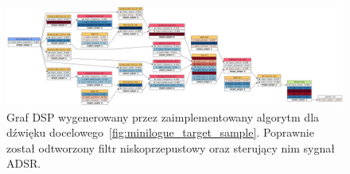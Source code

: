 \begin{figure}[H]
    \centering
    \includegraphics[width=1.0\linewidth]{rys06/evolved_graph_minilogue.png}
    \caption{
      Graf DSP wygenerowany przez zaimplementowany algorytm
      dla dźwięku docelowego~\ref{fig:minilogue_target_sample}.
      Poprawnie został odtworzony filtr niskoprzepustowy oraz
      sterujący nim sygnał ADSR\@.
    }\label{fig:evolved_graph_op1}
\end{figure}



